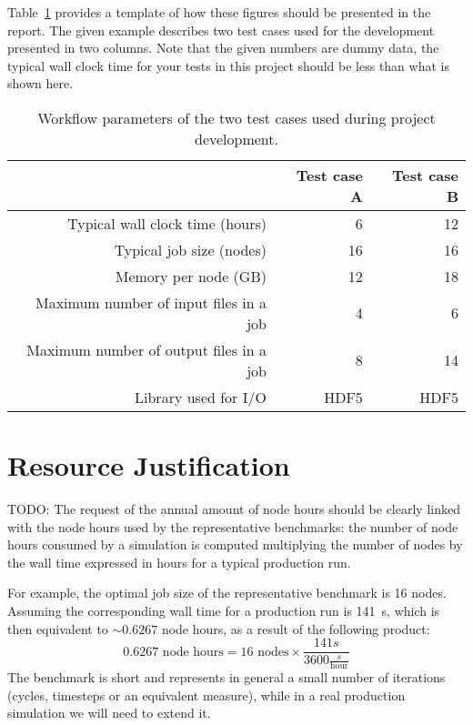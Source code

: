 \documentclass[11pt]{article}
\begin{document}
  Table~\ref{table:workflow_parameters} provides a template of how these 
  figures should be presented in the report. 
  The given example describes two test cases used for the development presented in two
  columns.  Note that the given numbers are dummy data, the typical wall clock
  time for your tests in this project should be less than what is shown here.
  \begin{table}[H]
    \begin{center}
      \begin{tabular}{@{}*3{r}@{}}
        \hline \hline
        & Test case A & Test case B \\
        \hline \hline
        Typical wall clock time (hours) & 6 & 12 \\
        Typical job size (nodes) & 16 & 16 \\
        Memory per node (GB) & 12 & 18 \\
        Maximum number of input files in a job & 4 & 6 \\
        Maximum number of output files in a job & 8 & 14 \\
        Library used for I/O & HDF5 & HDF5 \\
        \hline \hline
      \end{tabular}
    \end{center}
    \caption{Workflow parameters of the two test cases used during project
    development.}
    \label{table:workflow_parameters}
  \end{table}


\section{Resource Justification}

  TODO: The request of the annual amount of node hours should be clearly linked
  with the node hours used by the representative benchmarks: the number of node
  hours consumed by a simulation is computed multiplying the number of nodes by
  the wall time expressed in hours for a typical production run.

  For example, the optimal job size of
  the representative benchmark is 16 nodes.  Assuming the corresponding wall time
  for a production run is 141~s, which is then equivalent to $\sim
  0.6267$ node hours, as a result of the following product:
  \[
  0.6267\text{ node hours} = 16\text{ nodes}\times\frac{141 s}{3600 \frac{s}{\text{hour}}}
  \]
  The benchmark is short and represents in general a small number of iterations
  (cycles, timesteps or an equivalent measure), while in a real production
  simulation we will need to extend it.
\end{document}
